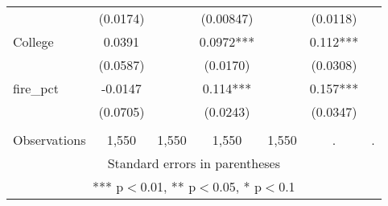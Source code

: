 \begin{tabular}{lcccccc}
 & (0.0174) &  & (0.00847) &  & (0.0118) &  \\
College & 0.0391 &  & 0.0972*** &  & 0.112*** &  \\
 & (0.0587) &  & (0.0170) &  & (0.0308) &  \\
fire\_pct & -0.0147 &  & 0.114*** &  & 0.157*** &  \\
 & (0.0705) &  & (0.0243) &  & (0.0347) &  \\
 &  &  &  &  &  &  \\
 Observations & 1,550 & 1,550 & 1,550 & 1,550 & . & . \\ \hline
\multicolumn{7}{c}{ Standard errors in parentheses} \\
\multicolumn{7}{c}{ *** p$<$0.01, ** p$<$0.05, * p$<$0.1} \\
\end{tabular}
